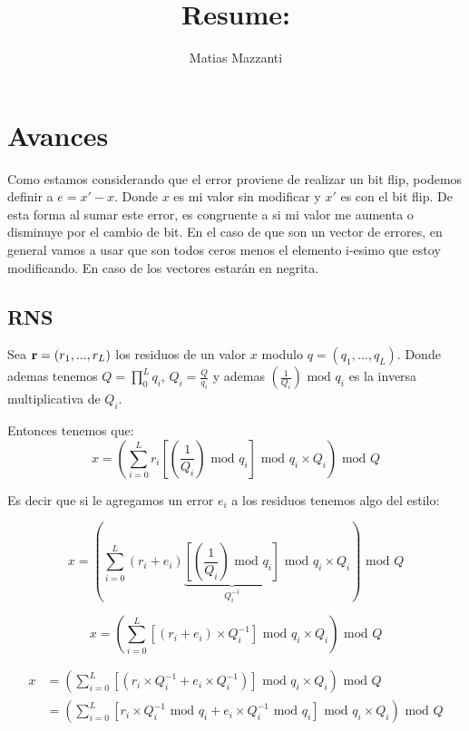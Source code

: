 \documentclass[12pt, oneside]{article}
\title{Resume: }
\author{Matias Mazzanti}
\date{}
\begin{document}
\maketitle
\tableofcontents

\section{Avances}

Como estamos considerando que el error proviene de realizar un bit flip, podemos definir a $e = x' - x$.
Donde $x$ es mi valor sin modificar y $x'$ es con el bit flip.
De esta forma al sumar este error, es congruente a si mi valor me aumenta o disminuye por el cambio
de bit.
En el caso de que son un vector de errores, en general vamos a usar que son todos ceros menos
el elemento i-esimo que estoy modificando.
En caso de los vectores estarán en negrita.

\subsection{RNS}

Sea $\bold{r} = (r_1, ..., r_L)$ los residuos de un valor $x$ modulo $q = (q_1, ...,q_L)$.
Donde ademas tenemos $Q = \prod_0^L q_i$, $Q_i = \frac{Q}{q_i}$ y ademas $\left(\frac{1}{Q_{i}}\right)\text{ mod } q_i$ es la inversa multiplicativa de $Q_i$.

Entonces tenemos que:
\begin{equation}
    x = \left(\sum_{i=0}^L r_i\left[\left(\frac{1}{Q_{i}}\right)\text{ mod } q_i\right]\text{ mod } q_i \times Q_i\right) \text{ mod } Q
\end{equation}

Es decir que si le agregamos un error $e_i$ a los residuos tenemos algo del estilo:

\begin{equation}
    x = \left(\sum_{i=0}^L (r_i+e_i)\underbrace{\left[\left(\frac{1}{Q_{i}}\right)\text{ mod } q_i\right]}_{Q_i^{-1}}\text{ mod } q_i \times Q_i\right) \text{ mod } Q
\end{equation}

\begin{equation}
    x = \left(\sum_{i=0}^L \left[(r_i+e_i)\times Q_i^{-1}\right]\text{ mod } q_i \times Q_i\right) \text{ mod } Q
\end{equation}

\begin{equation}
    \begin{split}
        x &= \left(\sum_{i=0}^L \left[(r_i\times Q_i^{-1} +e_i\times Q_i^{-1})\right]\text{ mod } q_i \times Q_i\right) \text{ mod } Q \\
          &= \left(\sum_{i=0}^L \left[r_i\times Q_i^{-1} \text{ mod } q_i +e_i\times Q_i^{-1}\text{ mod } q_i \right]\text{ mod } q_i \times Q_i\right) \text{ mod } Q \\
    \end{split}
\end{equation}
\end{document}
